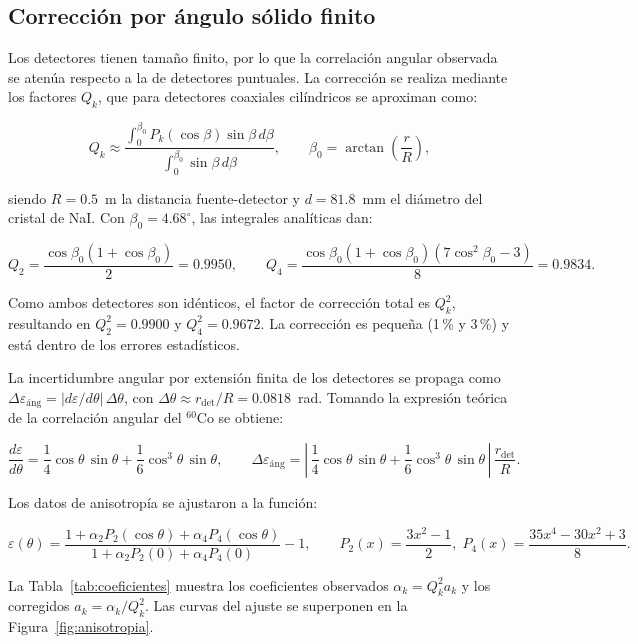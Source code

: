 \documentclass[11pt,a4paper]{article}
\begin{document}
\subsection{Correcci\'on por \'angulo s\'olido finito}

Los detectores tienen tama\~no finito, por lo que la correlaci\'on angular
observada se aten\'ua respecto a la de detectores puntuales. La correcci\'on
se realiza mediante los factores $Q_k$, que para detectores coaxiales
cil\'indricos se aproximan como:

\[
Q_k \approx \frac{\int_{0}^{\beta_0} P_k(\cos\beta) \sin\beta \, d\beta}
{\int_{0}^{\beta_0} \sin\beta \, d\beta},
\qquad
\beta_0 = \arctan\left(\frac{r}{R}\right),
\]

siendo $R = 0.5$~m la distancia fuente-detector y $d = 81.8$~mm el di\'ametro
del cristal de NaI. Con $\beta_0 = 4.68^\circ$, las integrales anal\'iticas dan:

\[
Q_2 = \frac{\cos\beta_0(1+\cos\beta_0)}{2} = 0.9950,
\qquad
Q_4 = \frac{\cos\beta_0(1+\cos\beta_0)(7\cos^2\beta_0 - 3)}{8} = 0.9834.
\]

Como ambos detectores son id\'enticos, el factor de correcci\'on total es
$Q_k^2$, resultando en $Q_2^2 = 0.9900$ y $Q_4^2 = 0.9672$. La correcci\'on
es peque\~na (1\,\% y 3\,\%) y est\'a dentro de los errores estad\'isticos.

La incertidumbre angular por extensi\'on finita de los detectores se propaga
como $\Delta\varepsilon_{\text{\'ang}} = |d\varepsilon/d\theta|\,\Delta\theta$,
con $\Delta\theta \approx r_{\text{det}}/R = 0.0818$~rad. Tomando la expresi\'on
te\'orica de la correlaci\'on angular del $^{60}$Co se obtiene:

\[
\frac{d\varepsilon}{d\theta} = \frac{1}{4}\cos\theta\,\sin\theta
+ \frac{1}{6}\cos^3\theta\,\sin\theta,
\qquad
\Delta\varepsilon_{\text{\'ang}} = \left|\,
\frac{1}{4}\cos\theta\,\sin\theta
+ \frac{1}{6}\cos^3\theta\,\sin\theta\,\right|\,
\frac{r_{\text{det}}}{R}.
\]

Los datos de anisotrop\'ia se ajustaron a la funci\'on:

\[
\varepsilon(\theta) = \frac{1 + \alpha_2 P_2(\cos\theta) + \alpha_4 P_4(\cos\theta)}
{1 + \alpha_2 P_2(0) + \alpha_4 P_4(0)} - 1,
\qquad
P_2(x) = \frac{3x^2 - 1}{2},\;
P_4(x) = \frac{35x^4 - 30x^2 + 3}{8}.
\]

La Tabla~\ref{tab:coeficientes} muestra los coeficientes observados
$\alpha_k = Q_k^2 a_k$ y los corregidos $a_k = \alpha_k / Q_k^2$.
Las curvas del ajuste se superponen en la Figura~\ref{fig:anisotropia}.
\end{document}
